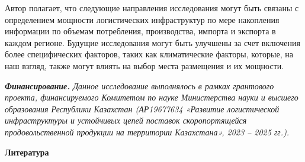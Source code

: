 \begin{multicols}{2}
Автор полагает, что следующие направления исследования могут быть
связаны с определением мощности логистических инфраструктур по мере
накопления информации по объемам потребления, производства, импорта и
экспорта в каждом регионе. Будущие исследования могут быть улучшены за
счет включения более специфических факторов, таких как климатические
факторы, которые, на наш взгляд, также могут влиять на выбор места
размещения и их мощности.

\emph{{\bfseries Финансирование.} Данное исследование выполнялось в рамках
грантового проекта, финансируемого Комитетом по науке Министерства науки
и высшего образования Республики Казахстан (АР19677634 «Развитие
логистической инфраструктуры и устойчивых цепей поставок скоропортящейся
продовольственной продукции на территории Казахстана», 2023 -- 2025
гг.).}
\end{multicols}

\begin{center}
{\bfseries Литература}
\end{center}

